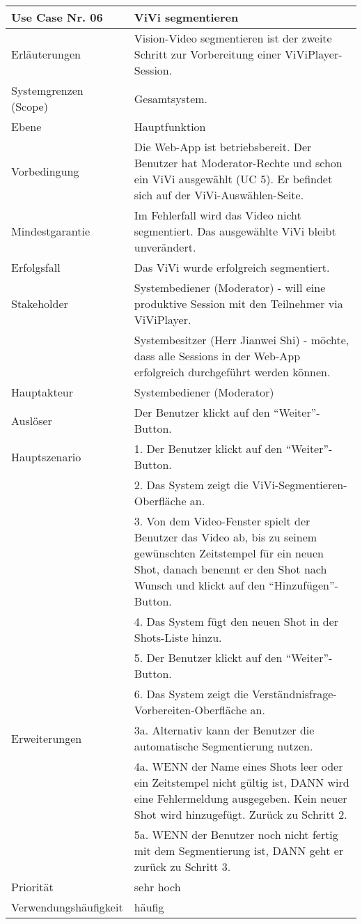 \begin{tabularx}{\linewidth}{|l|X|}
	\hline
	Use Case Nr. 06			& \textbf{ViVi segmentieren} \\ \hline
	Erläuterungen			& Vision-Video segmentieren ist der zweite Schritt zur 
							  Vorbereitung einer ViViPlayer-Session. \\ \hline
	Systemgrenzen (Scope)	& Gesamtsystem. \\ \hline
	Ebene					& Hauptfunktion \\ \hline
	Vorbedingung			& Die Web-App ist betriebsbereit. Der Benutzer hat 
	                          Moderator-Rechte und schon ein ViVi ausgewählt (UC 5). Er befindet sich auf der ViVi-Auswählen-Seite. \\ \hline
	Mindestgarantie			& Im Fehlerfall wird das Video nicht segmentiert. Das ausgewählte 
							  ViVi bleibt unverändert. \\ \hline
	Erfolgsfall 			& Das ViVi wurde erfolgreich segmentiert. \\ \hline
	Stakeholder				& Systembediener (Moderator) - will eine produktive Session mit den 
	                          Teilnehmer via ViViPlayer. \\
							& Systembesitzer (Herr Jianwei Shi) - möchte, dass alle Sessions 
							  in der Web-App erfolgreich durchgeführt werden können. \\ \hline
	Hauptakteur				& Systembediener (Moderator) \\ \hline
	Auslöser				& Der Benutzer klickt auf den ``Weiter''-Button. \\ \hline	
	Hauptszenario			& 1. Der Benutzer klickt auf den ``Weiter''-Button. \\
							& 2. Das System zeigt die ViVi-Segmentieren-Oberfläche an. \\
							& 3. Von dem Video-Fenster spielt der Benutzer das Video ab, bis 
							  zu seinem gewünschten Zeitstempel für ein neuen Shot, danach
							  benennt er den Shot nach Wunsch und klickt auf den ``Hinzufügen''-Button. \\
							& 4. Das System fügt den neuen Shot in der Shots-Liste
							  hinzu. \\
							& 5. Der Benutzer klickt auf den ``Weiter''-Button. \\
							& 6. Das System zeigt die Verständnisfrage-Vorbereiten-Oberfläche 
							  an. \\ \hline
	Erweiterungen			& 3a. Alternativ kann der Benutzer die automatische 
							  Segmentierung nutzen. \\
							& 4a. WENN der Name eines Shots leer oder ein Zeitstempel
							  nicht gültig ist, DANN wird eine Fehlermeldung ausgegeben. Kein neuer Shot wird hinzugefügt. Zurück zu Schritt 2. \\
							& 5a. WENN der Benutzer noch nicht fertig mit dem Segmentierung 
							  ist, DANN geht er zurück zu Schritt 3. \\ \hline
	Priorität				& sehr hoch \\ \hline
	Verwendungshäufigkeit	& häufig \\ \hline
\end{tabularx}